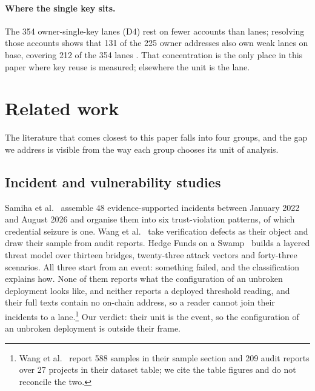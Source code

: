 \documentclass[10pt,a4paper]{article}
\newcommand{\code}[1]{\texttt{\detokenize{#1}}}
\begin{document}
\paragraph{Where the single key sits.}
The 354 owner-single-key lanes (D4) rest on fewer accounts than lanes; resolving those accounts shows
that 131 of the 225 owner addresses also own weak lanes on base, covering 212 of the 354 lanes
\code{[RESULTS:R8,R9]}. That concentration is the only place in this paper where key reuse is measured;
elsewhere the unit is the lane.

\section{Related work}
\label{sec:related}

The literature that comes closest to this paper falls into four groups, and the gap we address is visible
from the way each group chooses its unit of analysis.

\subsection{Incident and vulnerability studies}
Samiha et al.~\cite{samiha2026attack} assemble 48 evidence-supported incidents between January 2022 and
August 2026 and organise them into six trust-violation patterns, of which credential seizure is one. Wang
et al.~\cite{wang2026cvv} take verification defects as their object and draw their sample from audit reports.
Hedge Funds on a Swamp~\cite{hedgefunds2025} builds a layered threat model over thirteen bridges, twenty-three
attack vectors and forty-three scenarios. All three start from an event: something failed, and the
classification explains how. None of them reports what the configuration of an unbroken deployment looks
like, and neither reports a deployed threshold reading, and their full texts contain no on-chain address, so a reader cannot join their
incidents to a lane.\footnote{Wang et al.~\cite{wang2026cvv} report 588 samples in their sample section and
209 audit reports over 27 projects in their dataset table; we cite the table figures and do not reconcile
the two.} Our verdict: their unit is the event, so the configuration of an unbroken deployment is outside their frame.
\end{document}
